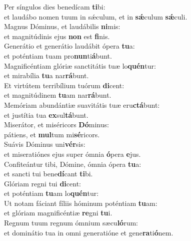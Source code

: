 \evenverse Per síngulos dies benedícam \textbf{ti}bi:~\*\\
\evenverse et laudábo nomen tuum in sǽculum, et in \textbf{sǽ}culum \textbf{sǽ}culi.\\
\oddverse Magnus Dóminus, et laudábilis \textbf{ni}mis:~\*\\
\oddverse et magnitúdinis ejus \textbf{non} est \textbf{fi}nis.\\
\evenverse Generátio et generátio laudábit ópera \textbf{tu}a:~\*\\
\evenverse et poténtiam tuam pro\textbf{nun}ti\textbf{á}bunt.\\
\oddverse Magnificéntiam glóriæ sanctitátis tuæ lo\textbf{quén}tur:~\*\\
\oddverse et mirabília \textbf{tu}a nar\textbf{rá}bunt.\\
\evenverse Et virtútem terribílium tuórum \textbf{di}cent:~\*\\
\evenverse et magnitúdinem \textbf{tu}am nar\textbf{rá}bunt.\\
\oddverse Memóriam abundántiæ suavitátis tuæ eru\textbf{ctá}bunt:~\*\\
\oddverse et justítia tua \textbf{ex}sul\textbf{tá}bunt.\\
\evenverse Miserátor, et miséricors \textbf{Dó}minus:~\*\\
\evenverse pátiens, et \textbf{mul}tum mi\textbf{sé}ricors.\\
\oddverse Suávis Dóminus uni\textbf{vér}sis:~\*\\
\oddverse et miseratiónes ejus super ómnia \textbf{ó}pera \textbf{e}jus.\\
\evenverse Confiteántur tibi, Dómine, ómnia ópera \textbf{tu}a:~\*\\
\evenverse et sancti tui bene\textbf{dí}cant \textbf{ti}bi.\\
\oddverse Glóriam regni tui \textbf{di}cent:~\*\\
\oddverse et poténtiam \textbf{tu}am lo\textbf{quén}tur:\\
\evenverse Ut notam fáciant fíliis hóminum poténtiam \textbf{tu}am:~\*\\
\evenverse et glóriam magnificéntiæ \textbf{re}gni \textbf{tu}i.\\
\oddverse Regnum tuum regnum ómnium sæcu\textbf{ló}rum:~\*\\
\oddverse et dominátio tua in omni generatióne et gene\textbf{ra}ti\textbf{ó}nem.\\
